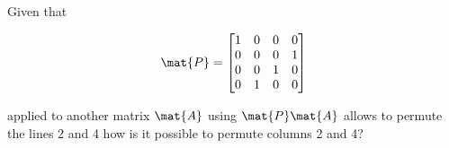 \bexo

Given that

\begin{equation}
	\mat{P} = \begin{bmatrix}
		1& 0& 0& 0\\
		0& 0& 0& 1\\
		0& 0& 1& 0\\
		0& 1& 0& 0
	\end{bmatrix}
\end{equation}

applied to another matrix $\mat{A}$ using $\mat{P}\mat{A}$ allows to permute the lines 2 and 4 how is it possible
to permute columns 2 and 4?
\eexo

